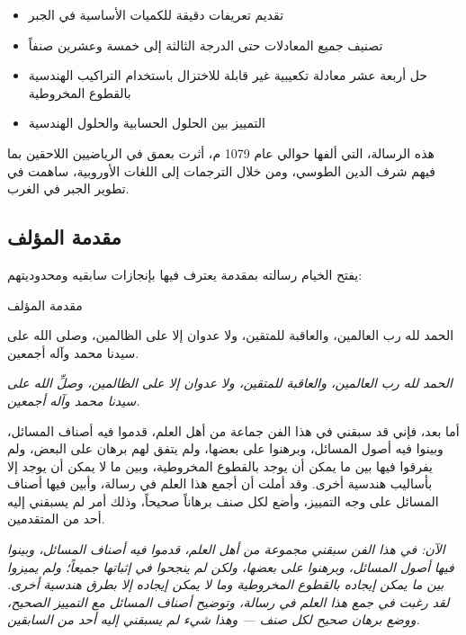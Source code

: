 \documentclass[11pt,a4paper]{book}
\newcommand{\ar}[1]{\leavevmode\arabicfont\beginR #1\endR}
\newcommand{\arBold}[1]{\leavevmode\arabicfontbold\beginR #1\endR}
\newenvironment{propbox}[1][]
  {\def\propboxtitle{#1}%
   \begin{snugshade}%
   \ifx\propboxtitle\empty\else
     \noindent{\bfseries\arabicfontbold\beginR #1\endR}\par\vspace{2pt}
   \fi}
  {\end{snugshade}}
\begin{document}
\begin{itemize}[noitemsep]
\item \ar{تقديم تعريفات دقيقة للكميات الأساسية في الجبر}
\item \ar{تصنيف جميع المعادلات حتى الدرجة الثالثة إلى خمسة وعشرين صنفاً}
\item \ar{حل أربعة عشر معادلة تكعيبية غير قابلة للاختزال باستخدام التراكيب الهندسية بالقطوع المخروطية}
\item \ar{التمييز بين الحلول الحسابية والحلول الهندسية}
\end{itemize}

هذه الرسالة، التي ألفها حوالي عام 1079 م، أثرت بعمق في الرياضيين اللاحقين بما فيهم \ar{شرف الدين الطوسي}، ومن خلال الترجمات إلى اللغات الأوروبية، ساهمت في تطوير الجبر في الغرب.

\subsection{\ar{مقدمة المؤلف}}

يفتح الخيام رسالته بمقدمة يعترف فيها بإنجازات سابقيه ومحدوديتهم:

\begin{propbox}[\arBold{مقدمة المؤلف}]

\ar{الحمد لله رب العالمين، والعاقبة للمتقين، ولا عدوان إلا على الظالمين، وصلى الله على سيدنا محمد وآله أجمعين.}

\vspace{0.3cm}

\textit{الحمد لله رب العالمين، والعاقبة للمتقين، ولا عدوان إلا على الظالمين، وصلِّ الله على سيدنا محمد وآله أجمعين.}

\vspace{0.5cm}

\ar{أما بعد، فإني قد سبقني في هذا الفن جماعة من أهل العلم، قدموا فيه أصناف المسائل، وبينوا فيه أصول المسائل، وبرهنوا على بعضها، ولم يتفق لهم برهان على البعض، ولم يفرقوا فيها بين ما يمكن أن يوجد بالقطوع المخروطية، وبين ما لا يمكن أن يوجد إلا بأساليب هندسية أخرى. وقد أملت أن أجمع هذا العلم في رسالة، وأبين فيها أصناف المسائل على وجه التمييز، وأضع لكل صنف برهاناً صحيحاً، وذلك أمر لم يسبقني إليه أحد من المتقدمين.}

\vspace{0.3cm}

\textit{الآن: في هذا الفن سبقني مجموعة من أهل العلم، قدموا فيه أصناف المسائل، وبينوا فيها أصول المسائل، وبرهنوا على بعضها، ولكن لم ينجحوا في إثباتها جميعاً؛ ولم يميزوا بين ما يمكن إيجاده بالقطوع المخروطية وما لا يمكن إيجاده إلا بطرق هندسية أخرى. لقد رغبت في جمع هذا العلم في رسالة، وتوضيح أصناف المسائل مع التمييز الصحيح، ووضع برهان صحيح لكل صنف --- وهذا شيء لم يسبقني إليه أحد من السابقين.}

\end{propbox}
\end{document}
